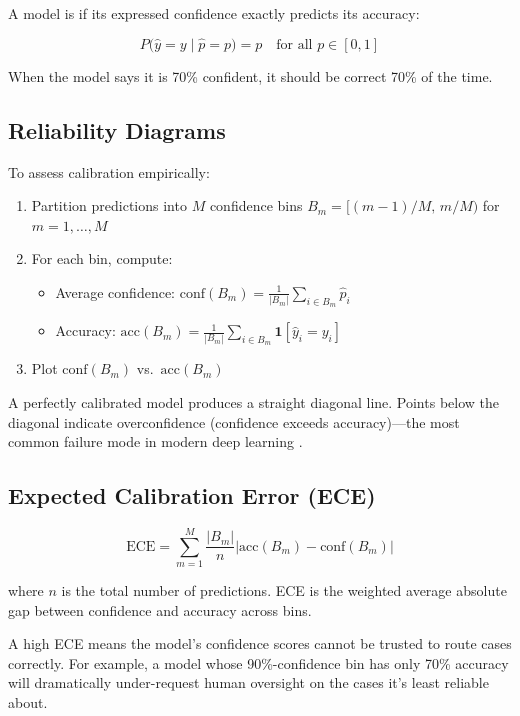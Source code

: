 A model is  if its expressed confidence exactly predicts its accuracy:

\[
P\bigl(\hat{y} = y \mid \hat{p} = p\bigr) = p \quad \text{for all } p \in [0,1]
\]

When the model says it is 70\% confident, it should be correct 70\% of the time.

\subsection{Reliability Diagrams}

To assess calibration empirically:
\begin{enumerate}
    \item Partition predictions into $M$ confidence bins $B_m = [(m-1)/M,\, m/M)$ for $m = 1,\ldots,M$
    \item For each bin, compute:
    \begin{itemize}
        \item Average confidence: $\text{conf}(B_m) = \frac{1}{|B_m|} \sum_{i \in B_m} \hat{p}_i$
        \item Accuracy: $\text{acc}(B_m) = \frac{1}{|B_m|} \sum_{i \in B_m} \mathbf{1}[\hat{y}_i = y_i]$
    \end{itemize}
    \item Plot $\text{conf}(B_m)$ vs.\ $\text{acc}(B_m)$
\end{enumerate}

A perfectly calibrated model produces a straight diagonal line. Points below the diagonal indicate overconfidence (confidence exceeds accuracy)---the most common failure mode in modern deep learning \autocite{guo2017calibration}.

\subsection{Expected Calibration Error (ECE)}

\[
\text{ECE} = \sum_{m=1}^{M} \frac{|B_m|}{n} \bigl|\text{acc}(B_m) - \text{conf}(B_m)\bigr|
\]

where $n$ is the total number of predictions. ECE is the weighted average absolute gap between confidence and accuracy across bins.

\begin{cautionbox}
A high ECE means the model's confidence scores cannot be trusted to route cases correctly. For example, a model whose 90\%-confidence bin has only 70\% accuracy will dramatically under-request human oversight on the cases it's least reliable about.
\end{cautionbox}

